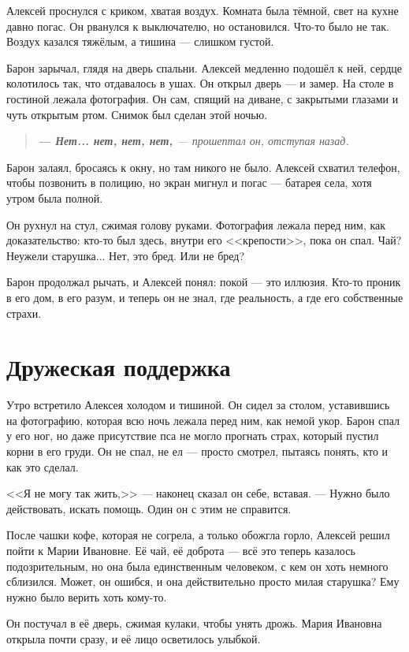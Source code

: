 \documentclass[12pt,a4paper]{book}
\newenvironment{dialogue}{\begin{quote}\itshape}{\end{quote}}
\begin{document}
Алексей проснулся с криком, хватая воздух. Комната была тёмной, свет на кухне давно погас. Он рванулся к выключателю, но остановился. Что-то было не так. Воздух казался тяжёлым, а тишина --- слишком густой.

Барон зарычал, глядя на дверь спальни. Алексей медленно подошёл к ней, сердце колотилось так, что отдавалось в ушах. Он открыл дверь --- и замер. На столе в гостиной лежала фотография. Он сам, спящий на диване, с закрытыми глазами и чуть открытым ртом. Снимок был сделан этой ночью.

\begin{dialogue}
\textbf{--- Нет... нет, нет, нет,} --- прошептал он, отступая назад.
\end{dialogue}

Барон залаял, бросаясь к окну, но там никого не было. Алексей схватил телефон, чтобы позвонить в полицию, но экран мигнул и погас --- батарея села, хотя утром была полной.

Он рухнул на стул, сжимая голову руками. Фотография лежала перед ним, как доказательство: кто-то был здесь, внутри его <<крепости>>, пока он спал. Чай? Неужели старушка... Нет, это бред. Или не бред?

Барон продолжал рычать, и Алексей понял: покой --- это иллюзия. Кто-то проник в его дом, в его разум, и теперь он не знал, где реальность, а где его собственные страхи.

\chapter{Дружеская поддержка}

Утро встретило Алексея холодом и тишиной. Он сидел за столом, уставившись на фотографию, которая всю ночь лежала перед ним, как немой укор. Барон спал у его ног, но даже присутствие пса не могло прогнать страх, который пустил корни в его груди. Он не спал, не ел --- просто смотрел, пытаясь понять, кто и как это сделал.

<<Я не могу так жить,>> --- наконец сказал он себе, вставая. --- Нужно было действовать, искать помощь. Один он с этим не справится.

После чашки кофе, которая не согрела, а только обожгла горло, Алексей решил пойти к Марии Ивановне. Её чай, её доброта --- всё это теперь казалось подозрительным, но она была единственным человеком, с кем он хоть немного сблизился. Может, он ошибся, и она действительно просто милая старушка? Ему нужно было верить хоть кому-то.

Он постучал в её дверь, сжимая кулаки, чтобы унять дрожь. Мария Ивановна открыла почти сразу, и её лицо осветилось улыбкой.
\end{document}
